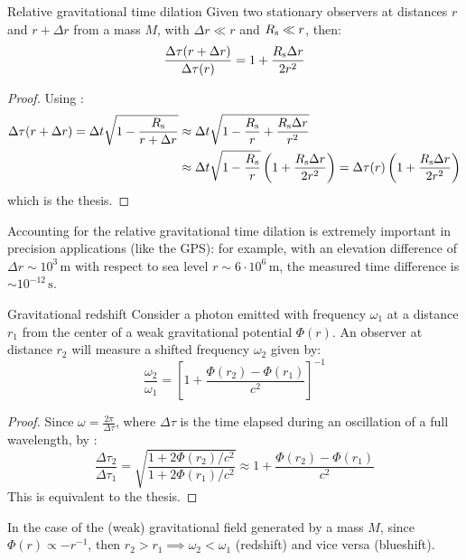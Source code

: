 \begin{proposition}{Relative gravitational time dilation}{}
  Given two stationary observers at distances $ r $ and $ r + \Delta r $ from a mass $ M $, with $ \Delta r \ll r $ and $ R_\text{s} \ll r $, then:
  \begin{equation}
    \frac{\Delta \tau(r + \Delta r)}{\Delta \tau(r)} = 1 + \frac{R_\text{s} \Delta r}{2 r^2}
  \end{equation}
\end{proposition}

\begin{proofbox}
  \begin{proof}
    Using :
    \begin{equation*}
      \begin{split}
        \Delta \tau(r + \Delta r) = \Delta t \sqrt{1 - \frac{R_\text{s}}{r + \Delta r}}
        & \approx \Delta t \sqrt{1 - \frac{R_\text{s}}{r} + \frac{R_\text{s} \Delta r}{r^2}} \\
        & \approx \Delta t \sqrt{1 - \frac{R_\text{s}}{r}} \left( 1 + \frac{R_\text{s} \Delta r}{2 r^2} \right) = \Delta \tau(r) \left( 1 + \frac{R_\text{s} \Delta r}{2 r^2} \right)
      \end{split}
    \end{equation*}
    which is the thesis.
  \end{proof}
\end{proofbox}

Accounting for the relative gravitational time dilation is extremely important in precision applications (like the GPS): for example, with an elevation difference of $ \Delta r \sim 10^3 \, \text{m} $ with respect to sea level $ r \sim 6 \cdot 10^6 \, \text{m} $, the measured time difference is $ \sim 10^{-12} \, \text{s} $.

\begin{proposition}{Gravitational redshift}{}
  Consider a photon emitted with frequency $ \omega_1 $ at a distance $ r_1 $ from the center of a weak gravitational potential $ \Phi(r) $. An observer at distance $ r_2 $ will measure a shifted frequency $ \omega_2 $ given by:
  \begin{equation}
    \frac{\omega_2}{\omega_1} = \left[ 1 + \frac{\Phi(r_2) - \Phi(r_1)}{c^2} \right]^{-1}
  \end{equation}
\end{proposition}

\begin{proofbox}
  \begin{proof}
    Since $ \omega = \frac{2\pi}{\Delta \tau} $, where $ \Delta \tau $ is the time elapsed during an oscillation of a full wavelength, by :
    \begin{equation*}
      \frac{\Delta \tau_2}{\Delta \tau_1} = \sqrt{\frac{1 + 2\Phi(r_2)/c^2}{1 + 2\Phi(r_1)/c^2}} \approx 1 + \frac{\Phi(r_2) - \Phi(r_1)}{c^2}
    \end{equation*}
    This is equivalent to the thesis.
  \end{proof}
\end{proofbox}

In the case of the (weak) gravitational field generated by a mass $ M $, since $ \Phi(r) \propto - r^{-1} $, then $ r_2 > r_1 \implies \omega_2 < \omega_1 $ (redshift) and vice versa (blueshift).










